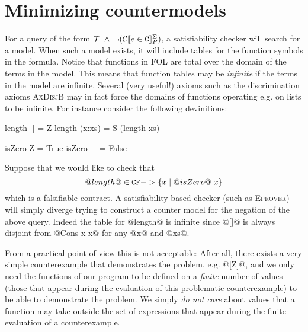\documentclass[preprint,nocopyrightspace,draft]{sigplanconf}
\begin{document}
\section{Minimizing countermodels}
For a query of the form ${\cal T}\;\land\;\neg(\ctrans{\Sigma}{P}{e \in \Ct})$, a satisfiability checker will search for
a model. When such a model exists, it will include tables for the function symbols in the formula. Notice that functions 
in FOL are total over the domain of the terms in the model. This means that function tables may be {\em infinite} if the 
terms in the model are infinite. Several (very useful!) axioms such as the discrimination axioms \textsc{AxDisjB} may in 
fact force the domains of functions operating e.g. on lists to be infinite. For instance consider the following devinitions:
\begin{code}
length [] = Z
length (x:xs) = S (length xs)

isZero Z = True
isZero _ = False
\end{code}
Suppose that we would like to check that 
   \[ @length@ \in \CF -> \{ x \mid @isZero@\;x\} \]
which is a falsifiable contract.  A satisfiability-based checker (such as \textsc{Eprover})
will simply diverge trying to construct a counter model for the negation of the above query.
Indeed the table for @length@ is infinite since @[]@ is always disjoint from @Cons x x@ for 
any @x@ and @xs@.

From a practical point of view this is not acceptable: After all, there exists a very simple 
counterexample that demonstrates the problem, e.g. @[Z]@, and we only need the 
functions of our program to be defined on a {\em finite} number of values (those that appear 
during the evaluation of this problematic counterexample) to be able to demonstrate 
the problem. We simply {\em do not care} about values that a function may take outside the set 
of expressions that appear during the finite evaluation of a counterexample.
\end{document}
